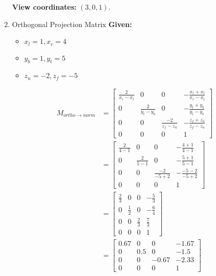 \documentclass{article}
\begin{document}
\begin{enumerate}
        \textbf{View coordinates:} $(3,0,1)$.
    \item Orthogonal Projection Matrix
        \medbreak
        \textbf{Given:}
        \begin{itemize}
            \item $x_l = 1, x_r = 4$
            \item $y_b = 1, y_t = 5$
            \item $z_n = -2, z_f = -5$
        \end{itemize}
        
        \begin{align*}
        M_{ortho \to norm} &= 
        \begin{bmatrix}
        \frac{2}{x_r - x_l} & 0 & 0 & -\frac{x_r + x_l}{x_r - x_l} \\
        0 & \frac{2}{y_t - y_b} & 0 & -\frac{y_t + y_b}{y_t - y_b} \\
        0 & 0 & \frac{-2}{z_f - z_n} & -\frac{z_f + z_n}{z_f - z_n} \\
        0 & 0 & 0 & 1
        \end{bmatrix} \\
        &= 
        \begin{bmatrix}
        \frac{2}{4 - 1} & 0 & 0 & -\frac{4 + 1}{4 - 1} \\
        0 & \frac{2}{5 - 1} & 0 & -\frac{5 + 1}{5 - 1} \\
        0 & 0 & \frac{-2}{-5 + 2} & -\frac{-5 - 2}{-5 + 2} \\
        0 & 0 & 0 & 1
        \end{bmatrix} \\
        &= 
        \begin{bmatrix}
        \frac{2}{3} & 0 & 0 & -\frac{5}{3} \\
        0 & \frac{1}{2} & 0 & -\frac{6}{4} \\
        0 & 0 & \frac{2}{3} & \frac{7}{3} \\
        0 & 0 & 0 & 1
        \end{bmatrix} \\
        &= 
        \begin{bmatrix}
        0.67 & 0 & 0 & -1.67 \\
        0 & 0.5 & 0 & -1.5 \\
        0 & 0 & -0.67 & -2.33 \\
        0 & 0 & 0 & 1
        \end{bmatrix}
        \end{align*}

\end{enumerate}
\end{document}
